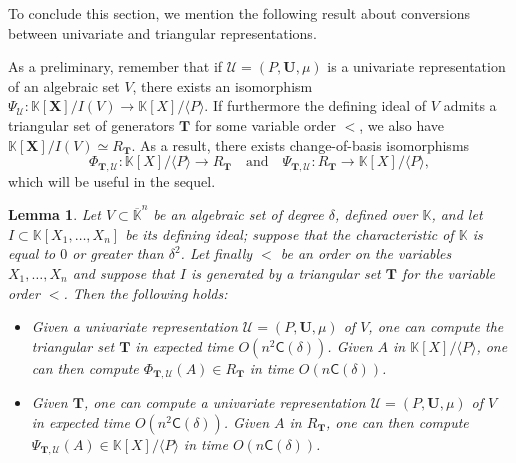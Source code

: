 \documentclass[12pt]{article}
\def\CC {\ensuremath{\mathsf{C}}}
\def\K {\ensuremath{\mathbb{K}}}
\def\Kbar {\ensuremath{\overline{\mathbb{K}}}}
\def\Tt {\ensuremath{\mathbf{T}}}
\def\Uu {\ensuremath{\mathbf{U}}}
\def\X {\ensuremath{\mathbf{X}}}
\def\Ur {\ensuremath{\mathscr U}}
\newtheorem{Lemma}{Lemma}
\begin{document}
To conclude this section, we mention the following result about
conversions between univariate and triangular representations.

As a preliminary, remember that if $\Ur=(P,\Uu,\mu)$ is a univariate
representation of an algebraic set $V$, there exists an isomorphism
$\Psi_\Ur: \K[\X]/I(V) \to \K[X]/\langle P \rangle$. If furthermore
the defining ideal of $V$ admits a triangular set of generators $\Tt$
for some variable order $<$, we also have $\K[\X]/I(V) \simeq
R_\Tt$. As a result, there exists  change-of-basis isomorphisms
$$\Phi_{\Tt,\Ur}: \K[X]/\langle P \rangle\to R_\Tt 
\quad\text{and}\quad \Psi_{\Tt,\Ur}:R_\Tt \to \K[X]/\langle P
\rangle,$$ which will be useful in the sequel.

\begin{Lemma}\label{lemma:conv}
  Let $V \subset\Kbar^n$ be an algebraic set of degree $\delta$,
  defined over $\K$, and let $I \subset \K[X_1,\dots,X_n]$ be its
  defining ideal; suppose that the characteristic of $\K$ is equal to
  $0$ or greater than $\delta^2$. Let finally $<$ be an order on the
  variables $X_1,\dots,X_n$ and suppose that $I$ is generated by a
  triangular set $\Tt$ for the variable order $<$. Then the following
  holds:
  \begin{itemize}
  \item Given a univariate representation $\Ur=(P,\Uu,\mu)$ of $V$,
    one can compute the triangular set $\Tt$ in expected time
    $O(n^2\CC(\delta))$. Given $A$ in $\K[X]/\langle P\rangle$, one
    can then compute $\Phi_{\Tt,\Ur}(A) \in R_\Tt$ in time
    $O(n\CC(\delta))$.

  \item Given $\Tt$, one can compute a univariate representation
    $\Ur=(P,\Uu,\mu)$ of $V$ in expected time $O(n^2\CC(\delta))$.
    Given $A$ in $R_\Tt$, one can then compute $\Psi_{\Tt,\Ur}(A) \in
    \K[X]/\langle P\rangle$ in time $O(n\CC(\delta))$.
  \end{itemize}
\end{Lemma}
\end{document}
